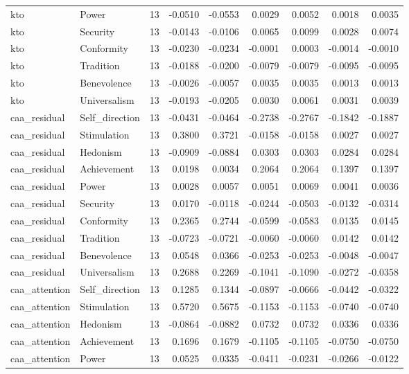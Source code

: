 \begin{tabular}{llrrrrrrr}
kto & Power & 13 & -0.0510 & -0.0553 & 0.0029 & 0.0052 & 0.0018 & 0.0035 \\
kto & Security & 13 & -0.0143 & -0.0106 & 0.0065 & 0.0099 & 0.0028 & 0.0074 \\
kto & Conformity & 13 & -0.0230 & -0.0234 & -0.0001 & 0.0003 & -0.0014 & -0.0010 \\
kto & Tradition & 13 & -0.0188 & -0.0200 & -0.0079 & -0.0079 & -0.0095 & -0.0095 \\
kto & Benevolence & 13 & -0.0026 & -0.0057 & 0.0035 & 0.0035 & 0.0013 & 0.0013 \\
kto & Universalism & 13 & -0.0193 & -0.0205 & 0.0030 & 0.0061 & 0.0031 & 0.0039 \\
caa\_residual & Self\_direction & 13 & -0.0431 & -0.0464 & -0.2738 & -0.2767 & -0.1842 & -0.1887 \\
caa\_residual & Stimulation & 13 & 0.3800 & 0.3721 & -0.0158 & -0.0158 & 0.0027 & 0.0027 \\
caa\_residual & Hedonism & 13 & -0.0909 & -0.0884 & 0.0303 & 0.0303 & 0.0284 & 0.0284 \\
caa\_residual & Achievement & 13 & 0.0198 & 0.0034 & 0.2064 & 0.2064 & 0.1397 & 0.1397 \\
caa\_residual & Power & 13 & 0.0028 & 0.0057 & 0.0051 & 0.0069 & 0.0041 & 0.0036 \\
caa\_residual & Security & 13 & 0.0170 & -0.0118 & -0.0244 & -0.0503 & -0.0132 & -0.0314 \\
caa\_residual & Conformity & 13 & 0.2365 & 0.2744 & -0.0599 & -0.0583 & 0.0135 & 0.0145 \\
caa\_residual & Tradition & 13 & -0.0723 & -0.0721 & -0.0060 & -0.0060 & 0.0142 & 0.0142 \\
caa\_residual & Benevolence & 13 & 0.0548 & 0.0366 & -0.0253 & -0.0253 & -0.0048 & -0.0047 \\
caa\_residual & Universalism & 13 & 0.2688 & 0.2269 & -0.1041 & -0.1090 & -0.0272 & -0.0358 \\
caa\_attention & Self\_direction & 13 & 0.1285 & 0.1344 & -0.0897 & -0.0666 & -0.0442 & -0.0322 \\
caa\_attention & Stimulation & 13 & 0.5720 & 0.5675 & -0.1153 & -0.1153 & -0.0740 & -0.0740 \\
caa\_attention & Hedonism & 13 & -0.0864 & -0.0882 & 0.0732 & 0.0732 & 0.0336 & 0.0336 \\
caa\_attention & Achievement & 13 & 0.1696 & 0.1679 & -0.1105 & -0.1105 & -0.0750 & -0.0750 \\
caa\_attention & Power & 13 & 0.0525 & 0.0335 & -0.0411 & -0.0231 & -0.0266 & -0.0122 \\

\end{tabular}
